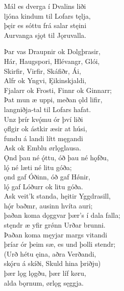 \bva Mál es dverga \hld í Dvalins liði \\%
ljóna kindum \hld til Lofars tęlja, \\%
þęir es sóttu \hld frá salar stęini \\%
Aurvanga sjǫt \hld til Jǫruvalla.\\%

\bva Þar vas Draupnir \hld ok Dolgþrasir, \\%
Hár, Haugspori, \hld Hlévangr, Glói, \\%
Skirfir, Virfir, \hld Skáfiðr, Ái, \\%
Alfr ok Yngvi, \hld Ęikinskjaldi, \\%
Fjalarr ok Frosti, \hld Finnr ok Ginnarr; \\%
Þat mun æ uppi, \hld meðan ǫld lifir, \\%
langniðja-tal \hld til Lofars hafat.\\%

\bva Unz þrír kvǫ́mu \hld ór því liði \\%
ǫflgir ok ástkir \hld æsir at húsi, \\%
fundu á landi \hld lítt męgandi \\%
Ask ok Emblu \hld ørlǫglausa.\\%

\bva Ǫnd þau né ǫ́ttu, \hld óð þau né hǫfðu, \\%
lǫ́ né læti \hld né litu góða; \\%
ǫnd gaf Óðinn, \hld óð gaf Hǿnir, \\%
lǫ́ gaf Lóðurr \hld ok litu góða.\\%

\bva Ask veit'k standa, \hld hęitir Yggdrasill, \\%
hǫ́r baðmr, ausinn \hld hvíta auri; \\%
þaðan koma dǫggvar \hld þær's í dala falla; \\%
stęndr æ yfir grǿnn \hld Urðar brunni.\\%

\bva Þaðan koma męyjar \hld margs vitandi \\%
þríar ór þeim sæ, \hld es und þolli stendr; \\%
(Urð hétu ęina, \hld aðra Verðandi, \\%
skǫ́ru á skíði, \hld Skuld hina þriðju) \\%
þær lǫg lǫgðu, \hld þær líf køru, \\%
alda bǫrnum, \hld ørlǫg sęggja.\\%

